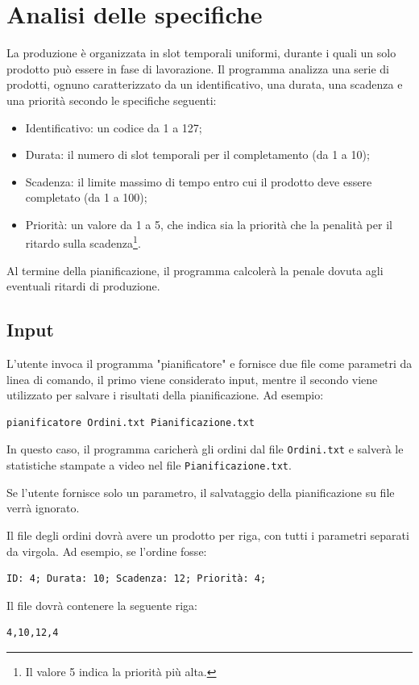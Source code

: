 \documentclass[a4paper]{report}
\begin{document}
\section{Analisi delle specifiche}
La produzione è organizzata in slot temporali uniformi, durante i quali un solo prodotto può essere in fase di lavorazione. Il programma analizza una serie di prodotti, ognuno caratterizzato da un identificativo, una durata, una scadenza e una priorità secondo le specifiche seguenti:
\begin{itemize}
  \item Identificativo: un codice da 1 a 127;
  \item Durata: il numero di slot temporali per il completamento (da 1 a 10);
  \item Scadenza: il limite massimo di tempo entro cui il prodotto deve essere completato (da 1 a 100);
  \item Priorità: un valore da 1 a 5, che indica sia la priorità che la penalità per il ritardo sulla scadenza\footnote{Il valore 5 indica la priorità più alta.}.
\end{itemize}
Al termine della pianificazione, il programma calcolerà la penale dovuta agli eventuali ritardi di produzione.

\subsection{Input}
L'utente invoca il programma "pianificatore" e fornisce due file come parametri da linea di comando, il primo viene considerato input, mentre il secondo viene utilizzato per salvare i risultati della pianificazione. Ad esempio:

\begin{verbatim}
pianificatore Ordini.txt Pianificazione.txt
\end{verbatim}

In questo caso, il programma caricherà gli ordini dal file \texttt{Ordini.txt} e salverà le statistiche stampate a video nel file \texttt{Pianificazione.txt}.

Se l'utente fornisce solo un parametro, il salvataggio della pianificazione su file verrà ignorato.

Il file degli ordini dovrà avere un prodotto per riga, con tutti i parametri separati da virgola. Ad esempio, se l'ordine fosse:
\begin{verbatim}
ID: 4; Durata: 10; Scadenza: 12; Priorità: 4;
\end{verbatim}
Il file dovrà contenere la seguente riga:
\begin{verbatim}
4,10,12,4
\end{verbatim}
\end{document}
